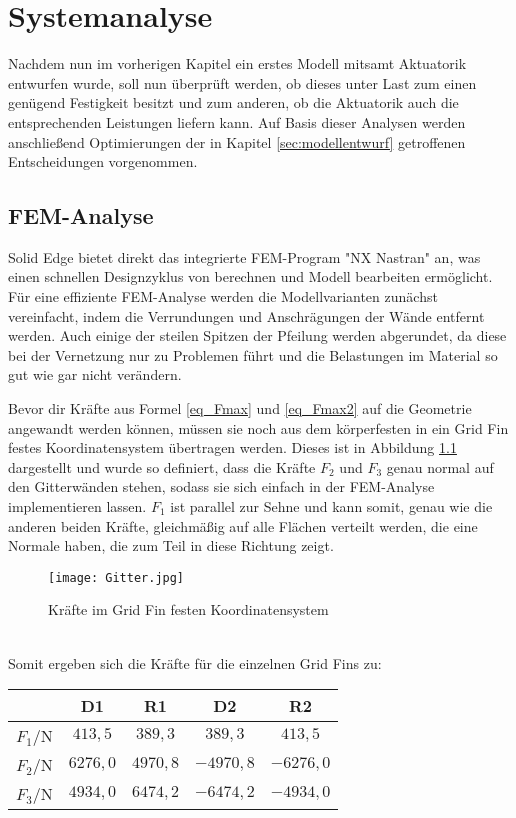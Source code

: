 \chapter{Systemanalyse}\label{sec:simulation}
Nachdem nun im vorherigen Kapitel ein erstes Modell mitsamt Aktuatorik entwurfen wurde, soll nun überprüft werden, ob dieses unter Last zum einen genügend Festigkeit besitzt und zum anderen, ob die Aktuatorik auch die entsprechenden Leistungen liefern kann. Auf Basis dieser Analysen werden anschließend Optimierungen der in Kapitel \ref{sec:modellentwurf} getroffenen Entscheidungen vorgenommen.


\section{FEM-Analyse}
Solid Edge bietet direkt das integrierte FEM-Program "NX Nastran" an, was einen schnellen Designzyklus von berechnen und Modell bearbeiten ermöglicht. Für eine effiziente FEM-Analyse werden die Modellvarianten zunächst vereinfacht, indem die Verrundungen und Anschrägungen der Wände entfernt werden. Auch einige der steilen Spitzen der Pfeilung werden abgerundet, da diese bei der Vernetzung nur zu Problemen führt und die Belastungen im Material so gut wie gar nicht verändern.

Bevor dir Kräfte aus Formel \ref{eq_Fmax} und \ref{eq_Fmax2} auf die Geometrie angewandt werden können, müssen sie noch aus dem körperfesten in ein Grid Fin festes Koordinatensystem übertragen werden. Dieses ist in Abbildung \ref{abb_gitter} dargestellt und wurde so definiert, dass die Kräfte $F_2$ und $F_3$ genau normal auf den Gitterwänden stehen, sodass sie sich einfach in der FEM-Analyse implementieren lassen. $F_1$ ist parallel zur Sehne und kann somit, genau wie die anderen beiden Kräfte, gleichmäßig auf alle Flächen verteilt werden, die eine Normale haben, die zum Teil in diese Richtung zeigt.
\begin{figure}[h] 
	\centering
	\texttt{[image: Gitter.jpg]}
	\caption{Kräfte im Grid Fin festen Koordinatensystem}
	\label{abb_gitter}
\end{figure}\\
Somit ergeben sich die Kräfte für die einzelnen Grid Fins zu:
\begin{table}[h]
	\centering
	\begin{tabular}{c||c|c|c|c}
		&D1&R1&D2&R2\\
		\hline
		$F_1/$N&$413,5$&$389,3$&$389,3$&$413,5$\\
		$F_2/$N&$6276,0$&$4970,8$&$-4970,8$&$-6276,0$\\
		$F_3/$N&$4934,0$&$6474,2$&$-6474,2$&$-4934,0$\\
	\end{tabular}
\end{table}
